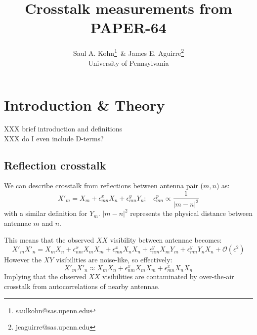 \documentclass[10pt,a4paper,notitlepage]{article}
\title{Crosstalk measurements from PAPER-64}
\author{Saul A. Kohn\thanks{saulkohn@sas.upenn.edu}\,\,\,\& James E. Aguirre\thanks{jeaguirre@sas.upenn.edu}\\ \small{University of Pennsylvania} }
\begin{document}
\maketitle


\section{Introduction \& Theory}

XXX brief introduction and definitions\\
XXX do I even include D-terms?

\subsection{Reflection crosstalk}
We can describe crosstalk from reflections between antenna pair ($m,n$) as:
\begin{equation}
X'_m = X_m + \epsilon^x_{mn}X_n + \epsilon^y_{mn}Y_n;~~~~\epsilon^p_{mn}\propto\frac{1}{|m-n|^2}
\end{equation}
\noindent with a similar definition for $Y_m$. $|m-n|^2$ represents the physical distance between antennae $m$ and $n$.

This means that the observed $XX$ visibility between antennae becomes:
\begin{equation}
X'_mX'_n = X_mX_n + \epsilon^x_{nm}X_mX_m + \epsilon^x_{mn}X_nX_n + \epsilon^y_{nm}X_mY_m + \epsilon^y_{mn}Y_nX_n + \mathcal{O}(\epsilon^2)
\end{equation}
\noindent However the $XY$ visibilities are noise-like, so effectively:
\begin{equation}
X'_mX'_n \approx X_mX_n + \epsilon^x_{nm}X_mX_m + \epsilon^x_{mn}X_nX_n 
\end{equation}
\noindent Implying that the observed $XX$ visibilities are contaminated by over-the-air crosstalk from autocorrelations of nearby antennae.
\end{document}
